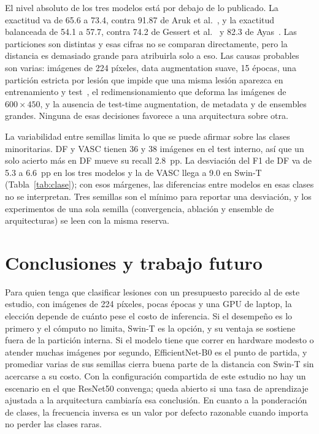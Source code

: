 \documentclass[conference]{IEEEtran}
\begin{document}
El nivel absoluto de los tres modelos está por debajo de lo publicado. La exactitud va de 65.6 a 73.4, contra 91.87 de Aruk et al.~\cite{aruk2026comparison}, y la exactitud balanceada de 54.1 a 57.7, contra 74.2 de Gessert et al.~\cite{gessert2020isic} y 82.3 de Ayas~\cite{ayas2023swin}. Las particiones son distintas y esas cifras no se comparan directamente, pero la distancia es demasiado grande para atribuirla solo a eso. Las causas probables son varias: imágenes de 224 píxeles, data augmentation suave, 15 épocas, una partición estricta por lesión que impide que una misma lesión aparezca en entrenamiento y test~\cite{cassidy2022isic}, el redimensionamiento que deforma las imágenes de $600\times450$, y la ausencia de test-time augmentation, de metadata y de ensembles grandes. Ninguna de esas decisiones favorece a una arquitectura sobre otra.

La variabilidad entre semillas limita lo que se puede afirmar sobre las clases minoritarias. DF y VASC tienen 36 y 38 imágenes en el test interno, así que un solo acierto más en DF mueve su recall 2.8~pp. La desviación del F1 de DF va de 5.3 a 6.6~pp en los tres modelos y la de VASC llega a 9.0 en Swin-T (Tabla~\ref{tab:clase}); con esos márgenes, las diferencias entre modelos en esas clases no se interpretan. Tres semillas son el mínimo para reportar una desviación, y los experimentos de una sola semilla (convergencia, ablación y ensemble de arquitecturas) se leen con la misma reserva.

\section{Conclusiones y trabajo futuro}

Para quien tenga que clasificar lesiones con un presupuesto parecido al de este estudio, con imágenes de 224 píxeles, pocas épocas y una GPU de laptop, la elección depende de cuánto pese el costo de inferencia. Si el desempeño es lo primero y el cómputo no limita, Swin-T es la opción, y su ventaja se sostiene fuera de la partición interna. Si el modelo tiene que correr en hardware modesto o atender muchas imágenes por segundo, EfficientNet-B0 es el punto de partida, y promediar varias de sus semillas cierra buena parte de la distancia con Swin-T sin acercarse a su costo. Con la configuración compartida de este estudio no hay un escenario en el que ResNet50 convenga; queda abierto si una tasa de aprendizaje ajustada a la arquitectura cambiaría esa conclusión. En cuanto a la ponderación de clases, la frecuencia inversa es un valor por defecto razonable cuando importa no perder las clases raras.
\end{document}
